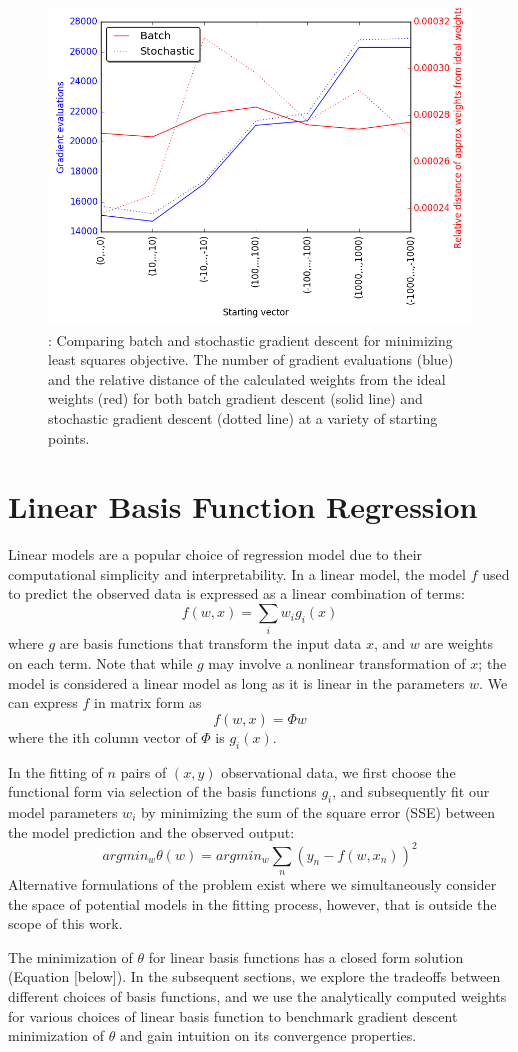 \documentclass[10pt, twocolumn]{article}
\begin{document}
\begin{figure}
\centering
\includegraphics[width=.4\textwidth,height =0.25\textheight]{batch_stochastic_comp.png}
\caption{\label{fig:1.3}: Comparing batch and stochastic gradient descent for minimizing least squares objective. The number of gradient evaluations (blue) and the relative distance of the calculated weights from the ideal weights (red) for both batch gradient descent (solid line) and stochastic gradient descent (dotted line) at a variety of starting points.}
\end{figure}

\section{Linear Basis Function Regression}

Linear models are a popular choice of regression model due to their computational simplicity and interpretability. In a linear model, the model $f$ used to predict the observed data is expressed as a linear combination of terms:
$$ f(w,x) = \sum_i w_ig_i(x) $$
where $g$ are basis functions that transform the input data $x$, and $w$ are weights on each term. Note that while $g$ may involve a nonlinear transformation of $x$; the model is considered a linear model as long as it is linear in the parameters $w$. We can express $f$ in matrix form as
$$f(w,x) = \Phi w$$
where the ith column vector of $\Phi$ is $g_i(x)$. 

In the fitting of $n$ pairs of $(x,y)$ observational data, we first choose the functional form via selection of the basis functions $g_i$, and subsequently fit our model parameters $w_i$ by minimizing the sum of the square error (SSE) between the model prediction and the observed output: 
$$ argmin_w \theta(w) = argmin_w \sum_n (y_n - f(w,x_n))^2$$ %
Alternative formulations of the problem exist where we simultaneously consider the space of potential models in the fitting process, however, that is outside the scope of this work.

The minimization of $\theta$ for linear basis functions has a closed form solution (Equation [below]). In the subsequent sections, we explore the tradeoffs between different choices of basis functions, and we use the analytically computed weights for various choices of linear basis function to benchmark gradient descent minimization of $\theta$ and gain intuition on its convergence properties. 
\end{document}
